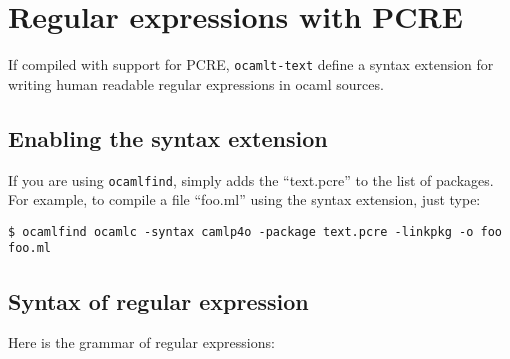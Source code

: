 \documentclass{article}
\newcommand{\oct}{\texttt{ocamlt-text}\xspace}
\begin{document}
\section{Regular expressions with PCRE}

If compiled with support for PCRE, \oct define a syntax extension for
writing human readable regular expressions in ocaml sources.

\subsection{Enabling the syntax extension}

If you are using \texttt{ocamlfind}, simply adds the ``text.pcre'' to
the list of packages. For example, to compile a file ``foo.ml'' using
the syntax extension, just type:

\begin{verbatim}
$ ocamlfind ocamlc -syntax camlp4o -package text.pcre -linkpkg -o foo foo.ml
\end{verbatim}

\subsection{Syntax of regular expression}

Here is the grammar of regular expressions:
\end{document}
